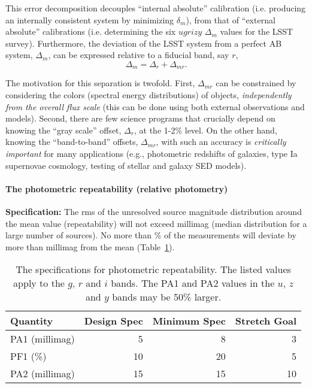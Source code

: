 This error decomposition decouples ``internal absolute'' calibration
(i.e. producing an internally consistent system by minimizing $\delta_m$),
from that of ``external absolute'' calibrations (i.e. determining the six
$ugrizy$ $\Delta_m$  values for the LSST survey). Furthermore, the deviation
of the LSST system from a perfect AB system, $\Delta_m$, can be expressed
relative to a fiducial band, say $r$,
\begin{equation}
            \Delta_m = \Delta_r + \Delta_{mr}.
\end{equation}

The motivation for this separation is twofold. First, $\Delta_{mr}$ can
be constrained by considering the colors (spectral energy distributions)
of objects, \textit{independently from the overall flux scale} (this can
be done using both external observations and models). Second, there are
few science programs that crucially depend on knowing the ``gray
scale'' offset, $\Delta_r$, at the 1-2\% level. On the other hand,
knowing the ``band-to-band'' offsets, $\Delta_{mr}$, with such an
accuracy is \textit{critically important} for many applications (e.g.,
photometric redshifts of galaxies, type Ia supernovae cosmology, testing
of stellar and galaxy SED models).



\paragraph{The photometric repeatability (relative photometry)\\}

\textbf{Specification:} The rms of the unresolved source magnitude
distribution around the mean value (repeatability) will not exceed
millimag (median distribution for a large number of sources). No more than
\% of the measurements will deviate by more than
 millimag from the mean (Table~\ref{relPhotometry}).


\begin{table}[h]
\begin{tabular}{|l|r|r|r|}
\hline
Quantity   & Design Spec & Minimum Spec & Stretch Goal   \\
\hline
      PA1 (millimag)  &     5       &       8      &        3  \\
      PF1  (\%)       &    10       &      20      &        5  \\
      PA2 (millimag)  &    15       &      15      &       10  \\
\hline
\end{tabular}
\caption{The specifications for photometric repeatability. The listed
values apply to the $g$, $r$ and $i$ bands.  The PA1 and PA2 values in
the $u$, $z$ and $y$ bands may be 50\% larger.}
\label{relPhotometry}
\end{table}

